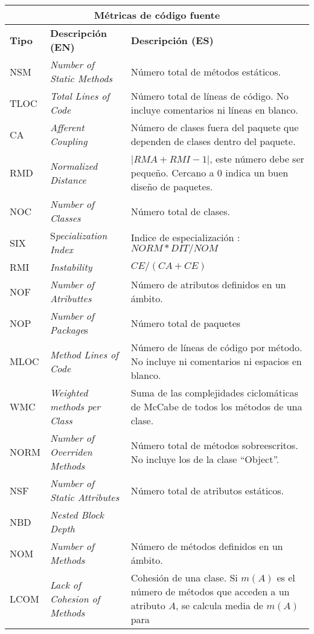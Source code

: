    \begin{longtable}{|p{2cm}|p{3cm}|p{8cm}|}

      \hline 
	    \multicolumn{3}{|c|}{\textbf{Métricas de código fuente}}\\ \hline
	     \textbf{Tipo} &  \textbf{Descripción (EN)} &  \textbf{Descripción (ES)} \\ \hline
      \endhead
			NSM&\textit{Number of Static Methods} & Número total de métodos estáticos.\\ \hline
			TLOC&\textit{Total Lines of Code}&Número total de líneas de código. No incluye
			comentarios ni líneas en blanco.\\ \hline 
			CA&\textit{Afferent Coupling} &Número de clases fuera del paquete que dependen de
			clases dentro del paquete.\\ \hline 
			RMD&\textit{Normalized Distance} & $|RMA + RMI - 1 |$, este número debe ser pequeño.
			Cercano a 0 indica un buen diseño de paquetes.\\ \hline
			NOC&\textit{Number of Classes}& Número total de clases.\\ \hline
			SIX&S\textit{pecialization Index} &Indice de especialización :$NORM * DIT / NOM$\\			\hline 
			RMI&\textit{Instability} & $CE / (CA + CE)$\\ \hline
			NOF&\textit{Number of Atributtes} &Número de atributos definidos en un ámbito.\\ \hline
			NOP&\textit{Number of Package}s& Número  total de paquetes\\ \hline
			MLOC&\textit{Method Lines of Code} & Número de líneas de código por método. No incluye
			ni comentarios ni espacios en blanco.\\ \hline
			WMC&\textit{Weighted methods per Class}& Suma de las complejidades ciclomáticas de
			McCabe de todos los métodos de una clase. \\ \hline 
			NORM&\textit{Number of Overriden Methods}&Número total de métodos sobreescritos. No
			incluye los de la clase ``Object''. \\ \hline 
			NSF&\textit{Number of Static Attributes} & Número total de atributos estáticos.\\ \hline
			NBD&\textit{Nested Block Depth} &\\ \hline
			NOM&\textit{Number of Methods} & Número de métodos definidos en un ámbito.\\ \hline
			LCOM&\textit{Lack of Cohesion of Methods}& Cohesión de una clase. Si $m(A)$ es el
			número de métodos que acceden a un atributo $A$, se calcula media de $m(A)$ para

\end{longtable}
